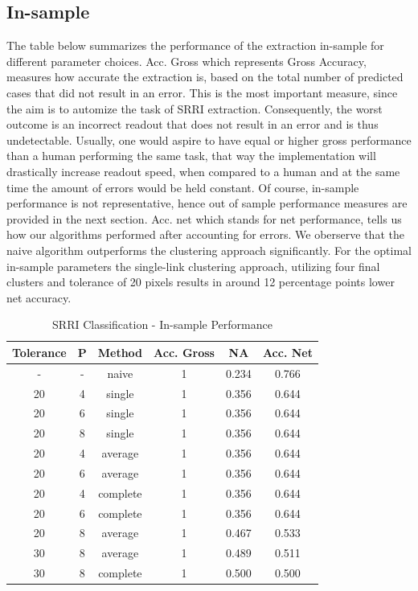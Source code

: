 \documentclass[aodsor,preprint]{imsart}
\numberwithin{equation}{section}
\theoremstyle{plain}
\begin{document}
\subsection{In-sample}
The table below summarizes the performance of the extraction in-sample for different parameter choices. Acc. Gross which represents Gross Accuracy, measures how accurate the extraction is, based on the total number of predicted cases that did not result in an error. This is the most important measure, since the aim is to automize the task of SRRI extraction. Consequently, the worst outcome is an incorrect readout that does not result in an error and is thus undetectable. Usually, one would aspire to have equal or higher gross performance than a human performing the same task, that way the implementation will drastically increase readout speed, when compared to a human and at the same time the amount of errors would be held constant. Of course, in-sample performance is not representative, hence out of sample performance measures are provided in the next section. Acc. net which stands for net performance, tells us how our algorithms performed after accounting for errors. We oberserve that the naive algorithm outperforms the clustering approach significantly. For the optimal in-sample parameters the single-link clustering approach, utilizing four final clusters and tolerance of 20 pixels results in around 12 percentage points lower net accuracy.

\begin{table}[H]
	\begin{center}
		\caption{SRRI Classification - In-sample Performance}
		\begin{tabular}{|c|c|c|c|c|c|}
			\hline
			Tolerance & P & Method & Acc. Gross & NA & Acc. Net\\
			\hline
			- & - & naive & 1 & 0.234 & 0.766\\
			\hline
			 20 & 4 & single & 1 & 0.356 & 0.644\\
			\hline
			 20 & 6 & single & 1 & 0.356 & 0.644 \\
			\hline
			 20 & 8 & single & 1 & 0.356 & 0.644 \\
			\hline
			 20 & 4 & average & 1 & 0.356 & 0.644\\
			\hline
			 20 & 6 & average & 1 & 0.356 & 0.644\\
			\hline
			 20 & 4 & complete & 1 & 0.356 & 0.644\\
			\hline
			 20 & 6 & complete & 1 & 0.356 & 0.644\\
			\hline
			 20 & 8 & average & 1 & 0.467 & 0.533\\
			\hline
			 30 & 8 & average & 1 & 0.489 & 0.511\\
			\hline
			 30 & 8 & complete & 1 & 0.500 & 0.500\\
			\hline
		\end{tabular}
	\end{center}
\end{table}
\end{document}
